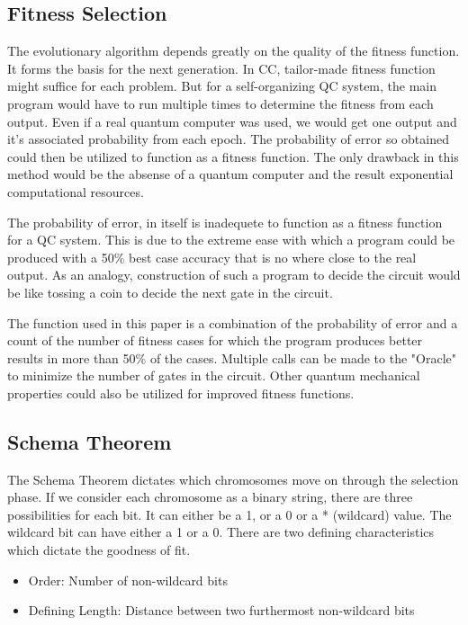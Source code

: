 \documentclass[conference]{IEEEtran}
\begin{document}
\subsection{Fitness Selection}
The evolutionary algorithm depends greatly on the quality of the fitness function. It forms the basis for the next generation. In CC, tailor-made fitness function might suffice for each problem. But for a self-organizing QC system, the main program would have to run multiple times to determine the fitness from each output. Even if a real quantum computer was used, we would get one output and it's associated probability from each epoch. The probability of error so obtained could then be utilized to function as a fitness function. The only drawback in this method would be the absense of a quantum computer and the result exponential computational resources. 

The probability of error, in itself is inadequete to function as a fitness function for a QC system. This is due to the extreme ease with which a program could be produced with a 50\% best case accuracy that is no where close to the real output. As an analogy, construction of such a program to decide the circuit would be like tossing a coin to decide the next gate in the circuit. 

The function used in this paper is a combination of the probability of error and a count of the number of fitness cases for which the program produces better results in more than 50\% of the cases. Multiple calls can be made to the "Oracle" to minimize the number of gates in the circuit. Other quantum mechanical properties could also be utilized for improved fitness functions. 

\subsection{Schema Theorem}
The Schema Theorem \cite{st} dictates which chromosomes move on through the selection phase. If we consider each chromosome as a binary string, there are three possibilities for each bit. It can either be a 1, or a 0 or a * (wildcard) value. The wildcard bit can have either a 1 or a 0. There are two defining characteristics which dictate the goodness of fit. 

\begin{itemize}
\item Order: Number of non-wildcard bits 
\item Defining Length: Distance between two furthermost non-wildcard bits
\end{itemize}
\end{document}
